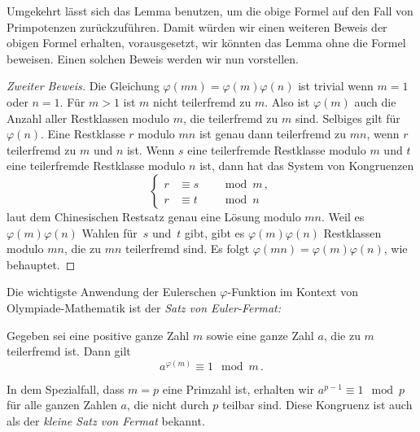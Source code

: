 Umgekehrt lässt sich das Lemma benutzen, um die obige Formel auf den Fall von Primpotenzen zurückzuführen. Damit würden wir einen weiteren Beweis der obigen Formel erhalten, vorausgesetzt, wir könnten das Lemma ohne die Formel beweisen. Einen solchen Beweis werden wir nun vorstellen.

\begin{proof}[Zweiter Beweis]
	Die Gleichung $\varphi(mn)=\varphi(m)\varphi(n)$ ist trivial wenn $m=1$ oder $n=1$. Für $m>1$ ist $m$ nicht teilerfremd zu $m$. Also ist $\varphi(m)$ auch die Anzahl aller Restklassen modulo $m$, die teilerfremd zu $m$ sind. Selbiges gilt für $\varphi(n)$. Eine Restklasse $r$ modulo $mn$ ist genau dann teilerfremd zu $mn$, wenn $r$ teilerfremd zu $m$ und $n$ ist. Wenn $s$ eine teilerfremde Restklasse modulo $m$ und $t$ eine teilerfremde Restklasse modulo $n$ ist, dann hat das System von Kongruenzen
	\begin{equation*}
		\left\{\begin{alignedat}{2}
			r&\equiv s&&\mod m\,,\\
			r&\equiv t&&\mod n
		\end{alignedat}\right.
	\end{equation*}
	laut dem Chinesischen Restsatz genau eine Lösung modulo $mn$. Weil es $\varphi(m)\varphi(n)$ Wahlen für~$s$ und~$t$ gibt, gibt es $\varphi(m)\varphi(n)$ Restklassen modulo $mn$, die zu $mn$ teilerfremd sind. Es folgt $\varphi(mn)=\varphi(m)\varphi(n)$, wie behauptet.
\end{proof}

Die wichtigste Anwendung der Eulerschen $\varphi$-Funktion im Kontext von Olympiade-Mathematik ist der \emph{Satz von Euler-Fermat:}
\begin{satzmitnamen}
	Gegeben sei eine positive ganze Zahl $m$ sowie eine ganze Zahl $a$, die zu $m$ teilerfremd ist. Dann gilt
	\begin{equation*}
		a^{\varphi(m)}\equiv 1\mod m\,.
	\end{equation*}
\end{satzmitnamen}
In dem Spezialfall, dass $m=p$ eine Primzahl ist, erhalten wir $a^{p-1}\equiv 1\mod p$ für alle ganzen Zahlen $a$, die nicht durch $p$ teilbar sind. Diese Kongruenz ist auch als der \emph{kleine Satz von Fermat} bekannt.


